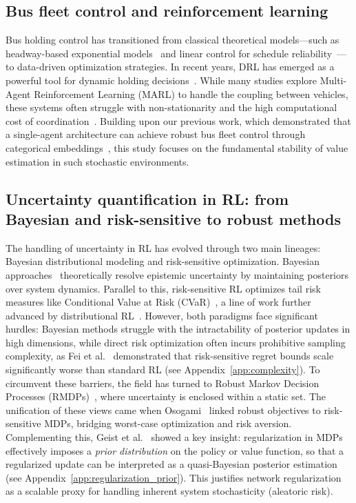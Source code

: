 \documentclass[10pt]{article}
\begin{document}
\subsection{Bus fleet control and reinforcement learning}
Bus holding control has transitioned from classical theoretical models---such as headway-based exponential models~\cite{Daganzo2009Headway} and linear control for schedule reliability~\cite{Xuan2013BusHolding}---to data-driven optimization strategies. In recent years, DRL has emerged as a powerful tool for dynamic holding decisions~\cite{Wang2020DynamicHolding}. While many studies explore Multi-Agent Reinforcement Learning (MARL) to handle the coupling between vehicles, these systems often struggle with non-stationarity and the high computational cost of coordination~\cite{Gronauer2022MultiAgent, Papoudakis2019NonStationarity, Vinyals2019StarCraft}. Building upon our previous work, which demonstrated that a single-agent architecture can achieve robust bus fleet control through categorical embeddings~\cite{Zhang2025SingleAgentBus}, this study focuses on the fundamental stability of value estimation in such stochastic environments.

\subsection{Uncertainty quantification in RL: from Bayesian and risk-sensitive to robust methods}
The handling of uncertainty in RL has evolved through two main lineages: Bayesian distributional modeling and risk-sensitive optimization. Bayesian approaches~\cite{Depeweg2018Decomposition, Derman2019BayesianRobust} theoretically resolve epistemic uncertainty by maintaining posteriors over system dynamics. Parallel to this, risk-sensitive RL optimizes tail risk measures like Conditional Value at Risk (CVaR)~\cite{Chow2014CVaR, Chow2015RiskSensitive}, a line of work further advanced by distributional RL~\cite{Bellemare2017Distributional, Dabney2018QuantileRegression}. However, both paradigms face significant hurdles: Bayesian methods struggle with the intractability of posterior updates in high dimensions, while direct risk optimization often incurs prohibitive sampling complexity, as Fei et al.~\cite{Fei2020RiskSensitive} demonstrated that risk-sensitive regret bounds scale significantly worse than standard RL (see Appendix~\ref{app:complexity}). To circumvent these barriers, the field has turned to Robust Markov Decision Processes (RMDPs)~\cite{Wiesemann2013RobustMDP, Iyengar2005RobustDP}, where uncertainty is enclosed within a static set. The unification of these views came when Osogami~\cite{Osogami2012Robustness} linked robust objectives to risk-sensitive MDPs, bridging worst-case optimization and risk aversion. Complementing this, Geist et al.~\cite{Geist2019TheoryRegularized} showed a key insight: regularization in MDPs effectively imposes a \textit{prior distribution} on the policy or value function, so that a regularized update can be interpreted as a quasi-Bayesian posterior estimation (see Appendix~\ref{app:regularization_prior}). This justifies network regularization as a scalable proxy for handling inherent system stochasticity (aleatoric risk).
\end{document}
